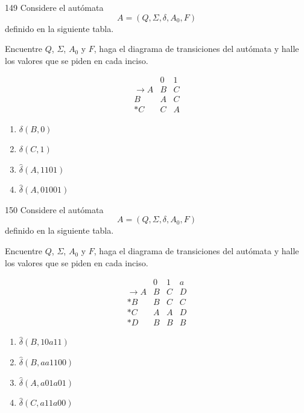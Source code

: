 \documentclass[12pt]{article}
\begin{document}
\begin{enunciado}{149}
Considere el autómata
\[
A=(Q,\Sigma,\delta,A_0,F)
\]
definido en la siguiente tabla.

Encuentre $Q$, $\Sigma$, $A_0$ y $F$, haga el diagrama de transiciones
del autómata y halle los valores que se piden en cada inciso.

\[
\begin{array}{c|cc}
 & 0 & 1\\
\hline
\rightarrow A & B & C\\
B & A & C\\
* C & C & A
\end{array}
\]

\begin{enumerate}[label=\alph*)]
    \item $\delta(B,0)$
    
    \item $\delta(C,1)$
    
    \item $\hat{\delta}(A,1101)$
    
    \item $\hat{\delta}(A,01001)$
\end{enumerate}
\end{enunciado}

\begin{enunciado}{150}
Considere el autómata
\[
A=(Q,\Sigma,\delta,A_0,F)
\]
definido en la siguiente tabla.

Encuentre $Q$, $\Sigma$, $A_0$ y $F$, haga el diagrama de transiciones
del autómata y halle los valores que se piden en cada inciso.

\[
\begin{array}{c|ccc}
 & 0 & 1 & a\\
\hline
\rightarrow A & B & C & D\\
* B & B & C & C\\
* C & A & A & D\\
* D & B & B & B
\end{array}
\]

\begin{enumerate}[label=\alph*)]
    \item $\hat{\delta}(B,10a11)$
    
    \item $\hat{\delta}(B,aa1100)$
    
    \item $\hat{\delta}(A,a01a01)$
    
    \item $\hat{\delta}(C,a11a00)$
\end{enumerate}
\end{enunciado}
\end{document}
